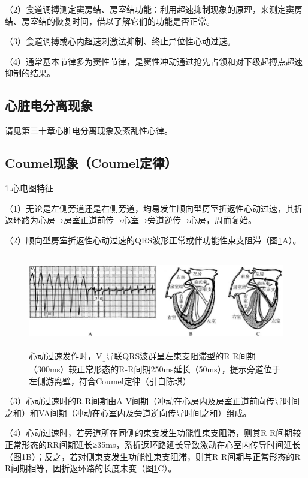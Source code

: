（2）食道调搏测定窦房结、房室结功能：利用超速抑制现象的原理，来测定窦房结、房室结的恢复时间，借以了解它们的功能是否正常。

（3）食道调搏或心内超速刺激法抑制、终止异位性心动过速。

（4）通常基本节律多为窦性节律，是窦性冲动通过抢先占领和对下级起搏点超速抑制的结果。

\protect\hypertarget{text00047.htmlux5cux23subid546}{}{}

\subsection{心脏电分离现象}

请见第三十章心脏电分离现象及紊乱性心律。

\protect\hypertarget{text00047.htmlux5cux23subid547}{}{}

\subsection{Coumel现象（Coumel定律）}

1.心电图特征

（1）无论是左侧旁道还是右侧旁道，均易发生顺向型房室折返性心动过速，其折返环路为心房→房室正道前传→心室→旁道逆传→心房，周而复始。

（2）顺向型房室折返性心动过速的QRS波形正常或伴功能性束支阻滞（图\ref{fig40-11}A）。

\begin{figure}[!htbp]
 \centering
 \includegraphics[width=5.78125in,height=1.61458in]{./images/Image00672.jpg}
 \captionsetup{justification=centering}
 \caption{心动过速发作时，V\textsubscript{1}导联QRS波群呈左束支阻滞型的R-R间期（300ms）较正常形态的R-R间期250ms延长（50ms），提示旁道位于左侧游离壁，符合Coumel定律（引自陈琪）}
 \label{fig40-11}
  \end{figure} 


（3）心动过速时的R-R间期由A-V间期（冲动在心房内及房室正道前向传导时间之和）和VA间期（冲动在心室内及旁道逆向传导时间之和）组成。

（4）心动过速时，若旁道所在同侧的束支发生功能性束支阻滞，则其R-R间期较正常形态的RR间期延长≥35ms，系折返环路延长导致激动在心室内传导时间延长（图\ref{fig40-11}B）；反之，若对侧束支发生功能性束支阻滞，则其R-R间期与正常形态的R-R间期相等，因折返环路的长度未变（图\ref{fig40-11}C）。

